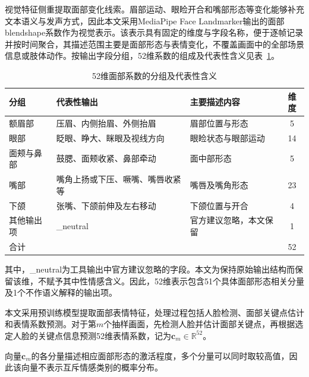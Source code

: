视觉特征侧重提取面部变化线索。眉部运动、眼睑开合和嘴部形态等变化能够补充文本语义与发声方式，因此本文采用MediaPipe Face Landmarker输出的面部blendshape系数作为视觉表示。该表示具有固定的维度与字段名称，便于逐帧记录并按时间聚合，其描述范围主要是面部形态与表情变化，不覆盖画面中的全部场景信息或肢体动作。按输出字段分组，52维系数的组成及代表性含义见表~\ref{tab:p1_visual_groups}。

\begin{table}[H]
    \centering\small
    \caption{52维面部系数的分组及代表性含义}
    \label{tab:p1_visual_groups}
    \setlength{\tabcolsep}{6pt}
    \renewcommand{\arraystretch}{1.12}
    \ifdefined\pOneCompactTableBox\else\newsavebox{\pOneCompactTableBox}\fi
    \begin{lrbox}{\pOneCompactTableBox}
    \begin{tabular}{l>{\raggedright\arraybackslash}p{16em}>{\raggedright\arraybackslash}p{11em}c}
        \toprule
        分组 & 代表性输出 & 主要描述内容 & 维度\\
        \midrule
        额眉部 & 压眉、内侧抬眉、外侧抬眉 & 眉部位置与形态 & 5\\
        眼部 & 眨眼、睁大、眯眼及视线方向 & 眼睑状态与眼部运动 & 14\\
        面颊与鼻部 & 鼓腮、面颊收紧、鼻部牵动 & 面中部形态 & 5\\
        嘴部 & 嘴角上扬或下压、噘嘴、嘴唇收紧等 & 嘴唇及嘴角形态 & 23\\
        下颌 & 张嘴、下颌前伸及左右移动 & 下颌位置与开合 & 4\\
        其他输出项 & \_neutral & 官方建议忽略，本文保留 & 1\\
        \midrule
        合计 & & & 52\\
        \bottomrule
    \end{tabular}
    \end{lrbox}
    \usebox{\pOneCompactTableBox}
\end{table}

其中，\_neutral为工具输出中官方建议忽略的字段。本文为保持原始输出结构而保留该维，不赋予其中性情感含义。因此，52维表示包含51个具体面部形态相关分量及1个不作语义解释的输出项。

本文采用预训练模型提取面部表情特征，处理过程包括人脸检测、面部关键点估计和表情系数预测。对于第$m$个抽样画面，先检测人脸并估计面部关键点，再根据选定人脸的关键点信息预测52维表情系数，记为$\boldsymbol{c}_m\in\mathbb{R}^{52}$。

向量$\boldsymbol{c}_m$的各分量描述相应面部形态的激活程度，多个分量可以同时取较高值，因此该向量不表示互斥情感类别的概率分布。

